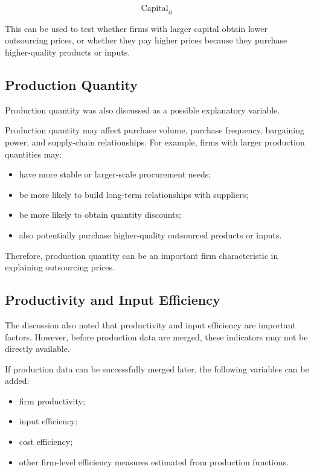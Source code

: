 \documentclass[11pt,a4paper]{article}
\begin{document}
\[
\text{Capital}_{it}
\]

This can be used to test whether firms with larger capital obtain lower outsourcing prices, or whether they pay higher prices because they purchase higher-quality products or inputs.

\subsection{Production Quantity}

Production quantity was also discussed as a possible explanatory variable.

Production quantity may affect purchase volume, purchase frequency, bargaining power, and supply-chain relationships. For example, firms with larger production quantities may:

\begin{itemize}
    \item have more stable or larger-scale procurement needs;
    \item be more likely to build long-term relationships with suppliers;
    \item be more likely to obtain quantity discounts;
    \item also potentially purchase higher-quality outsourced products or inputs.
\end{itemize}

Therefore, production quantity can be an important firm characteristic in explaining outsourcing prices.

\subsection{Productivity and Input Efficiency}

The discussion also noted that productivity and input efficiency are important factors. However, before production data are merged, these indicators may not be directly available.

If production data can be successfully merged later, the following variables can be added:

\begin{itemize}
    \item firm productivity;
    \item input efficiency;
    \item cost efficiency;
    \item other firm-level efficiency measures estimated from production functions.
\end{itemize}
\end{document}
